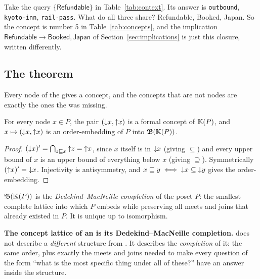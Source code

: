 \begin{tryit}
Take the query $\{\textsf{Refundable}\}$ in Table~\ref{tab:context}. Its
answer is \texttt{outbound}, \texttt{kyoto-inn}, \texttt{rail-pass}. What do
all three share? \textsf{Refundable}, \textsf{Booked}, \textsf{Japan}. So the
concept is number 5 in Table~\ref{tab:concepts}, and the implication
$\textsf{Refundable} \to \textsf{Booked}, \textsf{Japan}$ of
Section~\ref{sec:implications} is just this closure, written differently.
\end{tryit}

\subsection{The theorem}

Every node of the \odag{} gives a concept, and the concepts that are not nodes
are exactly the ones the \odag{} was missing.

\begin{proposition}
\label{prop:embedding}
For every node $x \in P$, the pair $(\mathord{\downarrow}x, \mathord{\uparrow}x)$ is a formal concept of
$\mathbb{K}(P)$, and $x \mapsto (\mathord{\downarrow}x, \mathord{\uparrow}x)$ is an order-embedding of $P$
into $\mathfrak{B}(\mathbb{K}(P))$.
\end{proposition}

\begin{proof}
$(\mathord{\downarrow}x)' = \bigcap_{z \sqsubseteq x}\mathord{\uparrow}z = \mathord{\uparrow}x$, since $x$ itself is in
$\mathord{\downarrow}x$ (giving $\subseteq$) and every upper bound of $x$ is an upper bound
of everything below $x$ (giving $\supseteq$). Symmetrically
$(\mathord{\uparrow}x)' = \mathord{\downarrow}x$. Injectivity is antisymmetry, and
$x \sqsubseteq y \iff \mathord{\downarrow}x \subseteq \mathord{\downarrow}y$ gives the order-embedding.
\end{proof}

\begin{theorem}
\label{thm:dm}
$\mathfrak{B}(\mathbb{K}(P))$ is the \emph{Dedekind--MacNeille completion} of the poset
$P$: the smallest complete lattice into which $P$ embeds while preserving all
meets and joins that already existed in $P$. It is unique up to isomorphism.
\end{theorem}

\begin{keyidea}
\textbf{The concept lattice of an \odag{} is its Dedekind--MacNeille
completion.} \fca{} does not describe a \emph{different} structure from
\odag{}. It describes the \emph{completion} of it: the same order, plus
exactly the meets and joins needed to make every question of the form ``what
is the most specific thing under all of these?'' have an answer inside the
structure.
\end{keyidea}

